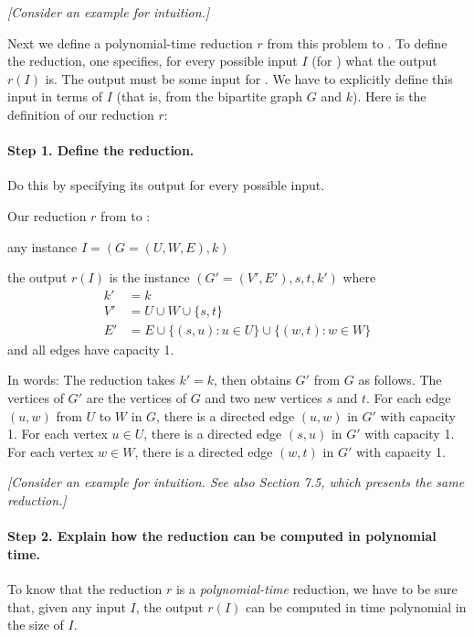 \emph{[Consider an example for intuition.]}

Next we define a polynomial-time reduction $r$ from this problem to .
To define the reduction, one specifies, for every possible input $I$ (for )
what the output $r(I)$ is.  The output must be some input for .
We have to explicitly define this input in terms of $I$ (that is, from the bipartite graph $G$ and $k$).
Here is the definition of our reduction $r$:

\paragraph{Step 1.  Define the reduction.} Do this by specifying its output for every possible input.

\begin{mylist}
\item[] Our reduction $r$ from  to : \em
\item[\bf input:] any  instance $I=(G=(U, W ,E), k)$
\item[\bf output:] the output $r(I)$ is the  instance $(G'=(V', E'), s, t, k')$ where
  \begin{align*}
    k' & {} = k \\
    V' & {} = U\cup W\cup\{s, t\} \\
    E' & {} = E \cup \{(s, u) : u\in U\} \cup \{(w, t) : w\in W\}
  \end{align*}
  and all edges have capacity 1.
\end{mylist}

In words: The reduction takes $k' = k$, then obtains $G'$ from $G$ as follows.
The vertices of $G'$ are the vertices of $G$ and two new vertices $s$ and $t$.
For each edge $(u, w)$ from $U$ to  $W$ in $G$,
there is a directed edge $(u, w)$ in $G'$ with capacity 1.
For each vertex $u\in U$,
there is a directed edge $(s, u)$ in $G'$ with capacity 1. 
For each vertex $w\in W$,
there is a directed edge $(w, t)$ in $G'$ with capacity 1. 

\smallskip

\emph{[Consider an example for intuition.  See also \KT Section 7.5, which presents the same reduction.]}

\paragraph{Step 2.  Explain how the reduction can be computed in polynomial time.}
To know that the reduction $r$ is a \emph{polynomial-time} reduction,
we have to be sure that, given any input $I$, the output $r(I)$
can be computed in time polynomial in the size of $I$.

